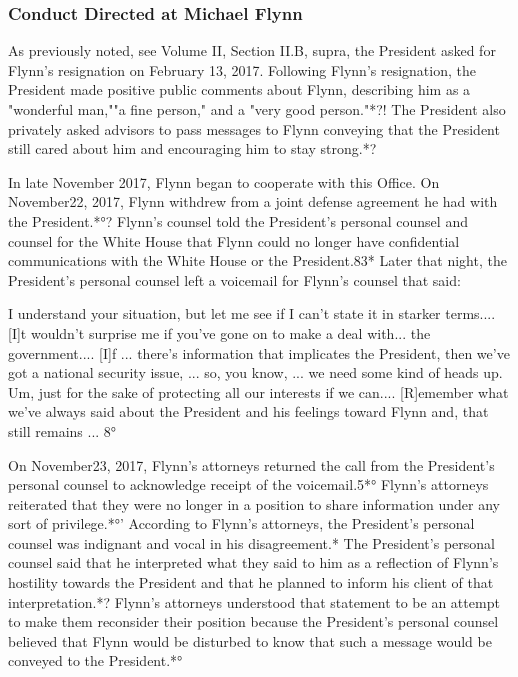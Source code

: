 \subsubsection{Conduct Directed at Michael Flynn}

As previously noted, see Volume II, Section II.B, supra, the President asked for Flynn's resignation on February 13, 2017.
Following Flynn's resignation, the President made positive public comments about Flynn, describing him as a "wonderful man,""a fine person," and a "very good person."*?!
The President also privately asked advisors to pass messages to Flynn conveying that the President still cared about him and encouraging him to stay strong.*?

In late November 2017, Flynn began to cooperate with this Office.
On November22, 2017, Flynn withdrew from a joint defense agreement he had with the President.*°?
Flynn's counsel told the President's personal counsel and counsel for the White House that Flynn could no longer have confidential communications with the White House or the President.83*
Later that night, the President's personal counsel left a voicemail for Flynn's counsel that said:

I understand your situation, but let me see if I can't state it in starker terms....
[I]t wouldn't surprise me if you've gone on to make a deal with... the government....
[I]f ... there's information that implicates the President, then we've got a national security issue, ... so, you know, ... we need some kind of heads up.
Um, just for the sake of protecting all our interests if we can....
[R]emember what we've always said about the President and his feelings toward Flynn and, that still remains ... 8°

On November23, 2017, Flynn's attorneys returned the call from the President's personal counsel to acknowledge receipt of the voicemail.5*°
Flynn's attorneys reiterated that they were no longer in a position to share information under any sort of privilege.*°'
According to Flynn's attorneys, the President's personal counsel was indignant and vocal in his disagreement.*
The President's personal counsel said that he interpreted what they said to him as a reflection of Flynn's hostility towards the President and that he planned to inform his client of that interpretation.*?
Flynn's attorneys understood that statement to be an attempt to make them reconsider their position because the President's personal counsel believed that Flynn would be disturbed to know that such a message would be conveyed to the President.*°

